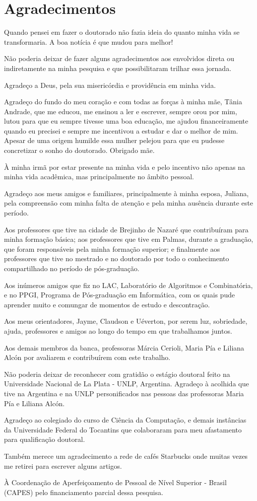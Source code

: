 \chapter*{Agradecimentos}

Quando pensei em fazer o doutorado não fazia ideia do quanto minha vida se transformaria. A boa notícia é que mudou para melhor!

Não poderia deixar de fazer alguns agradecimentos aos envolvidos direta ou indiretamente na minha pesquisa e que possibilitaram trilhar essa jornada. 

Agradeço a Deus, pela sua misericórdia e providência em minha vida.

Agradeço do fundo do meu coração e com todas as forças à minha mãe, Tânia Andrade, que me educou, me ensinou a ler e escrever, sempre orou por mim, lutou para que eu sempre tivesse uma boa educação, me ajudou financeiramente quando eu precisei e sempre me incentivou a estudar e dar o melhor de mim. Apesar de uma origem humilde essa mulher pelejou para que eu pudesse concretizar o sonho do doutorado. Obrigado mãe.

À minha irmã por estar presente na minha vida e pelo incentivo não apenas na minha vida acadêmica, mas principalmente no âmbito pessoal.

Agradeço aos meus amigos e familiares, principalmente à minha esposa, Juliana, pela compreensão com minha falta de atenção e pela minha ausência durante este período.

Aos professores que tive na cidade de Brejinho de Nazaré que contribuíram para minha formação básica; aos professores que tive em Palmas, durante a graduação, que foram responsáveis pela minha formação superior; e finalmente aos professores que tive no mestrado e no doutorado por todo o conhecimento compartilhado no período de pós-graduação.

Aos inúmeros amigos que fiz no LAC, Laboratório de Algoritmos e Combinatória, e no PPGI, Programa de Pós-graduação em Informática, com os quais pude aprender muito e comungar de momentos de estudo e descontração.

Aos meus orientadores, Jayme, Claudson e Uéverton, por serem luz, sobriedade, ajuda, professores e amigos ao longo do tempo em que trabalhamos juntos.

Aos demais membros da banca, professoras Márcia Cerioli, Maria Pía e Liliana Alcón por avaliarem e contribuírem com este trabalho.

Não poderia deixar de reconhecer com gratidão o estágio doutoral feito na Universidade Nacional de La Plata - UNLP, Argentina. Agradeço à acolhida que tive na Argentina e na UNLP personificados nas pessoas das professoras Maria Pía e Liliana Alcón.


Agradeço ao colegiado do curso de Ciência da Computação, e demais instâncias da Universidade Federal do Tocantins que colaboraram para meu afastamento para qualificação doutoral.



Também merece um agradecimento  a rede de cafés Starbucks onde muitas vezes me retirei para escrever alguns artigos. 


À Coordenação de Aperfeiçoamento 
de Pessoal de Nível Superior - Brasil (CAPES) pelo financiamento parcial dessa pesquisa.